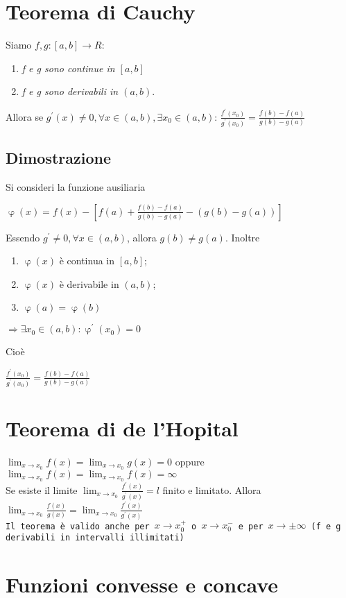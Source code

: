\section{Teorema di Cauchy}
Siamo $f,g:[a,b]\to R$:
\begin{enumerate}
	\item \textit{f e g sono continue in $[a,b]$}
	\item \textit{f e g sono derivabili in $(a,b)$}.
\end{enumerate}
Allora se $g^\prime (x) \neq 0, \forall x \in (a,b), \exists x_0\in(a,b)$:
$\frac{f^\prime (x_0)}{g^\prime (x_0)}=\frac{f(b)-f(a)}{g(b)-g(a)}$
\subsection{Dimostrazione}
Si consideri la funzione ausiliaria
\begin{center}
	$\upvarphi(x)=f(x)-[f(a)+\frac{f(b)-f(a)}{g(b)-g(a)}-(g(b)-g(a))]$
\end{center}
Essendo $g^\prime\neq 0, \forall x \in (a,b)$, allora $g(b)\neq g(a)$. Inoltre
\begin{enumerate}
	\item $\upvarphi(x)$ è continua in $[a,b]$;
	\item $\upvarphi(x)$ è derivabile in $(a,b)$;
	\item $\upvarphi(a)=\upvarphi(b)$
\end{enumerate}
\begin{center}
	$\Rightarrow \exists x_0 \in (a,b):\upvarphi^\prime(x_0)=0$
\end{center}
Cioè
\begin{center}
	$\frac{f^\prime (x_0)}{g^\prime(x_0)}=\frac{f(b)-f(a)}{g(b)-g(a)}$
\end{center}
\section{Teorema di de l'Hopital\label{del'hop}}
$\lim_{x\to x_0}f(x)=\lim_{x\to x_0}g(x)=0$ oppure $\lim_{x\to
x_0}f(x)=\lim_{x\to x_0}f(x)=\infty$\\
Se esiste il limite $\lim_{x\to x_0}\frac{f^\prime(x)}{g^\prime(x)}=l$ finito e
limitato. Allora $\lim_{x\to x_0}\frac{f(x)}{g(x)}=\lim_{x\to
x_0}\frac{f^\prime(x)}{g^\prime(x)}$\\
\texttt{Il teorema è valido anche per $x\to x_0^+$ o $x\to x_0^-$ e per $x\to
\pm\infty$ (f e g derivabili in intervalli illimitati)}
\section{Funzioni convesse e concave}
